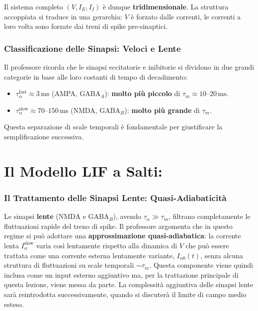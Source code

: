 Il sistema completo $(V, I_E, I_I)$ è dunque \textbf{tridimensionale}. La struttura accoppiata si traduce in una gerarchia: $V$ è forzato dalle correnti, le correnti a loro volta sono forzate dai treni di spike pre-sinaptici.

\subsubsection{Classificazione delle Sinapsi: Veloci e Lente}

Il professore ricorda che le sinapsi eccitatorie e inibitorie si dividono in due grandi categorie in base alle loro costanti di tempo di decadimento:

\begin{itemize}
    \item $\tau_\alpha^{\text{fast}} \approx 3\,\text{ms}$ (AMPA, GABA$_A$): \textbf{molto più piccolo} di $\tau_m \approx 10$–$20\,\text{ms}$.
    \item $\tau_\alpha^{\text{slow}} \approx 70$–$150\,\text{ms}$ (NMDA, GABA$_B$): \textbf{molto più grande} di $\tau_m$.
\end{itemize}

Questa separazione di scale temporali è fondamentale per giustificare la semplificazione successiva.

\section{Il Modello LIF a Salti:}

\subsubsection{Il Trattamento delle Sinapsi Lente: Quasi-Adiabaticità}

Le sinapsi \textbf{lente} (NMDA e GABA$_B$), avendo $\tau_\alpha \gg \tau_m$, filtrano completamente le fluttuazioni rapide del treno di spike. Il professore argomenta che in questo regime si può adottare una \textbf{approssimazione quasi-adiabatica}: la corrente lenta $I_\alpha^{\text{slow}}$ varia così lentamente rispetto alla dinamica di $V$ che può essere trattata come una corrente esterna lentamente variante, $I_{\alpha 0}(t)$, senza alcuna struttura di fluttuazioni su scale temporali $\sim \tau_m$. Questa componente viene quindi inclusa come un input esterno aggiuntivo ma, per la trattazione principale di questa lezione, viene messa da parte. La complessità aggiuntiva delle sinapsi lente sarà reintrodotta successivamente, quando si discuterà il limite di campo medio esteso.


